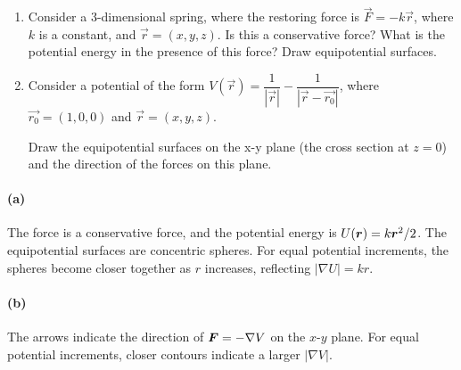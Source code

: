 \documentclass{article}
\begin{document}
\begin{problem}
\begin{enumerate}
  \item[a)] Consider a 3-dimensional spring, where the restoring force is $\vec{F}=-k\vec{r}$, where $k$ is a constant, and $\vec{r}=(x,y,z)$. Is this a conservative force? What is the potential energy in the presence of this force? Draw equipotential surfaces.
  \item[b)] Consider a potential of the form $V(\vec{r})=\dfrac{1}{|\vec{r}|}-\dfrac{1}{|\vec{r}-\overrightarrow{r_0}|}$, where $\overrightarrow{r_0}=(1,0,0)$ and $\vec{r}=(x,y,z)$.

  Draw the equipotential surfaces on the x-y plane (the cross section at $z=0$) and the direction of the forces on this plane.
\end{enumerate}
\end{problem}

\begin{solution}
	\paragraph{(a)} The force is a conservative force, and the potential energy is $U(\boldsymbol{r}) = k \boldsymbol{r}^2/2$. 
	The equipotential surfaces are concentric spheres. For equal potential
	increments, the spheres become closer together as $r$ increases,
	reflecting $|\nabla U|=kr$.

	\begin{center}
		
	\end{center}

	\noindent\begin{minipage}{\linewidth}
	\paragraph{(b)} The arrows indicate the direction of $\boldsymbol{F}=-\nabla V$
	on the $x$-$y$ plane. For equal potential increments, closer contours
	indicate a larger $|\nabla V|$.

	\begin{center}
		
	\end{center}
	\end{minipage}
\end{solution}
\end{document}
